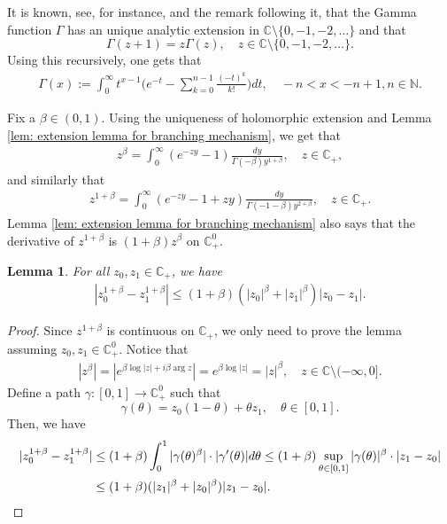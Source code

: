 \documentclass[12pt,a4paper]{amsart}
\theoremstyle{plain}
\newtheorem{lem}[thm]{Lemma}
\theoremstyle{definition}
\numberwithin{equation}{section}
\begin{document}
It is known, see, for instance, \cite[Theorem 6.1.3]{SteinShakarchi2003Complex} and the remark following it, that the Gamma function $\Gamma$ has an unique analytic extension in $\mathbb C\setminus\{0, -1,-2,\dots\}$ and that
\[
	\Gamma(z+1)
  = z \Gamma(z),\quad z\in \mathbb C\setminus\{0, -1,-2,\dots\}.
\]
Using this recursively, one gets that
\begin{align}
  \label{eq: definition of Gamma function}
  \Gamma(x)
  := \int_0^\infty t^{x-1} \Big(e^{-t} - \sum_{k=0}^{n-1} \frac{(-t)^k}{k!}\Big) dt,
  \quad -n< x< -n+1, n\in \mathbb N.
\end{align}

Fix a $\beta \in (0,1)$.
Using the uniqueness of holomorphic extension and Lemma \ref{lem: extension lemma for branching mechanism}, we get that
\begin{align}
  z^{\beta}
	= \int_0^\infty (e^{-zy}-1) \frac{dy}{\Gamma(-\beta)y^{1+\beta}},
  \quad z\in \mathbb C_+,
\end{align}
and similarly that
\begin{align}
  \label{eq: stable branching on C+}
  z^{1+\beta}
  = \int_0^\infty (e^{-zy}-1+zy)\frac{dy}{\Gamma(-1-\beta)y^{2+\beta}},
  \quad z\in \mathbb C_+.
\end{align}
Lemma \ref{lem: extension lemma for branching mechanism} also says that the derivative of $z^{1+\beta}$ is $(1+\beta)z^{\beta}$ on $\mathbb C^0_+$.
\begin{lem}
  \label{lem: Lip of power function}
  For all $z_0,z_1 \in \mathbb C_+$, we have
\begin{align}
  \label{eq: Lip of power function}
  |z_0^{1+\beta} - z_1^{1+\beta}|
  \leq (1+\beta)(|z_0|^{\beta}+|z_1|^{\beta})|z_0 - z_1|.
\end{align}
\end{lem}
\begin{proof}
  Since $z^{1+\beta}$ is continuous on $\mathbb C_+$, we only need to prove the lemma assuming $z_0,z_1 \in \mathbb C^0_+$.
  Notice that
  \begin{align}
    \label{eq: upper bound for beta power of z}
    |z^\beta|
    = |e^{\beta \log |z| +i\beta \operatorname {arg}z}| = e^{\beta \log |z|} = |z|^\beta,
    \quad z \in \mathbb C\setminus (-\infty, 0].
  \end{align}
  Define a path $\gamma: [0,1] \to \mathbb C^0_+$ such that
  \[
    \gamma(\theta)
    = z_0 (1-\theta) + \theta z_1,
    \quad \theta \in [0,1].
  \]
  Then, we have
  \begin{align}
    |z_0^{1+\beta} - z_1^{1+\beta}|
    & \leq (1+\beta) \int_0^1 |\gamma(\theta)^{\beta}|\cdot |\gamma'(\theta)|d\theta
      \leq (1+\beta)  \sup_{\theta \in [0,1]} |\gamma(\theta)|^{\beta} \cdot |z_1-z_0| \\
    & \leq (1+\beta)  ( |z_1|^{\beta}+|z_0|^{\beta} ) |z_1-z_0|.
      \qedhere
  \end{align}
\end{proof}
\end{document}
